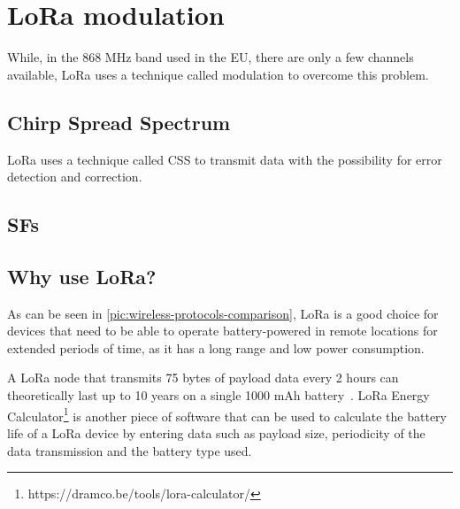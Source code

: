 \section{\acf{LoRa} modulation}\label{sec:lora-modulation}

While, in the 868 MHz band used in the \ac{EU}, there are only a few channels available, \ac{LoRa} uses a technique called modulation to overcome this problem.



\subsection{Chirp Spread Spectrum}

\ac{LoRa} uses a technique called \ac{CSS} to transmit data with the possibility for error detection and correction.


\subsection{\acfp{SF}}\label{sec:spreading-factors}


\subsection{Why use \acs{LoRa}?}

As can be seen in \cref{pic:wireless-protocols-comparison}, \ac{LoRa} is a good choice for devices that need to be able to operate battery-powered in remote locations for extended periods of time, as it has a long range and low power consumption.

A \ac{LoRa} node that transmits 75 bytes of payload data every 2 hours can theoretically last up to 10 years on a single 1000 mAh battery~\cite{cheong_comparison_2017-1}.
LoRa Energy Calculator\footnote{https://dramco.be/tools/lora-calculator/} is another piece of software that can be used to calculate the battery life of a \ac{LoRa} device by entering data such as payload size, periodicity of the data transmission and the battery type used.

